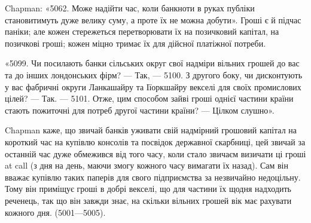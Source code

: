 Chapman: «5062. Може надійти час, коли банкноти в руках публіки становитимуть
дуже велику суму, а проте їх не можна добути». Гроші є й підчас
паніки; але кожен стережеться перетворювати їх на позичковий капітал, на
позичкові гроші; кожен міцно тримає їх для дійсної платіжної потреби.

«5099. Чи посилають банки сільських округ свої надміри вільних грошей
до вас та до інших лондонських фірм? — Так, — 5100. З другого боку, чи дисконтують
у вас фабричні округи Ланкашайру та Іїоркшайру векселі для своїх
промислових цілей? — Так. — 5101. Отже, цим способом зайві гроші однієї частини
країни стають пожиточні для потреб другої частини країни? — Цілком слушно».

Chapman каже, що звичай банків уживати свій надмірний грошовий капітал
на короткий час на купівлю консолів та посвідок державної скарбниці, цей звичай
за останній час дуже обмежився від того часу, коли стало звичаєм визичати ці
гроші at call (з дня на день, маючи змогу кожного часу вимагати їх назад).
Сам він вважає купівлю таких паперів для свого підприємства за незвичайно
недоцільну. Тому він приміщує гроші в добрі векселі, що для частини їх щодня
надходить реченець, так що він завжди знає, на скільки вільних грошей вік
має рахувати кожного дня. (5001—5005).
\parbreak{}  %
